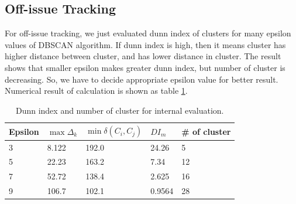 \subsection{Off-issue Tracking}

For off-issue tracking, we just evaluated dunn index of clusters for many epsilon values of DBSCAN algorithm.
If dunn index is high, then it means cluster has higher distance between cluster, and has lower distance in cluster.
The result shows that smaller epsilon makes greater dunn index, but number of cluster is decreasing. So,
we have to decide appropriate epsilon value for better result. Numerical result of calculation is shown as table \ref{table:dunnindex}.
\begin{table}[!htbp]
  \begin{tabular}{l|l|l|l|l}
  Epsilon   & $\max \Delta_{k}$ & $\min \delta(C_{i}, C_{j})$ & $DI_{m}$ & \# of cluster \\ \hline
  3 &  8.122 & 192.0 & 24.26 & 5 \\
  5 &  22.23 & 163.2 & 7.34 & 12 \\
  7 &  52.72 & 138.4 & 2.625 & 16  \\
  9 & 106.7 & 102.1 & 0.9564 & 28
  \end{tabular}
  \caption{Dunn index and number of cluster for internal evaluation.}
  \label{table:dunnindex}
\end{table}
